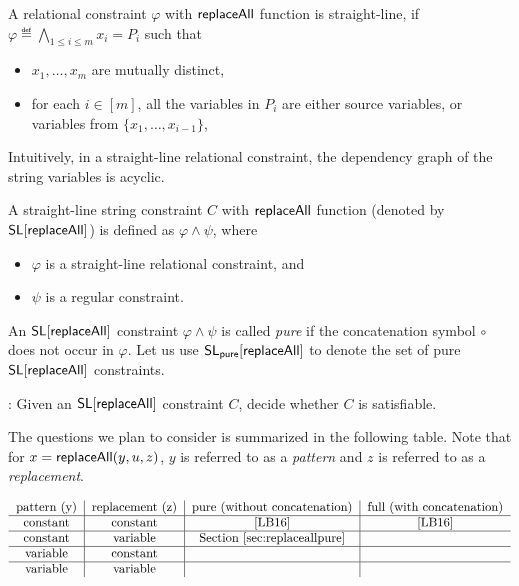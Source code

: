 \documentclass[sigplan,10pt,review,anonymous]{acmart}\settopmatter{printfolios=true}
\newcommand{\concat} {\circ}
\begin{document}
\begin{definition}
	A relational constraint $ \varphi$ with $\mathsf{replaceAll}$ function is straight-line, if $\varphi \eqdef \bigwedge \limits_{1 \le i \le m} x_i = P_i$ such that
	\begin{itemize}
		\item $x_1,\dots, x_m$ are mutually distinct,
		\item for each $i \in [m]$, all the variables in $P_i$ are either source variables, or variables from $\{x_1,\dots, x_{i-1}\}$,
	\end{itemize}
\end{definition}
Intuitively, in a straight-line relational constraint, the dependency graph of the string variables is acyclic.


\begin{definition}
	A straight-line string constraint $C$ with $\mathsf{replaceAll}$ function (denoted by $\mathsf{SL}[\mathsf{replaceAll}]$)  is defined as $ \varphi \wedge \psi$,  where 
	\begin{itemize}
		\item $\varphi$ is a straight-line relational constraint,  and
		\item $\psi$ is a regular constraint.
	\end{itemize}
	An $\mathsf{SL}[\mathsf{replaceAll}]$ constraint $\varphi \wedge \psi$ is called \emph{pure} if the concatenation symbol $\concat$ does not occur in $\varphi$. Let us use $\mathsf{SL_{pure}}[\mathsf{replaceAll}]$ to denote the set of pure $\mathsf{SL}[\mathsf{replaceAll}]$ constraints.
\end{definition}


: Given an $\mathsf{SL}[\mathsf{replaceAll}]$ constraint $C$, decide whether $C$ is satisfiable.

The questions we plan to consider is summarized in the following table. Note that for $x=\mathsf{replaceAll} (y,u,z)$, $y$ is referred to as a \emph{pattern} and $z$ is referred to as a \emph{replacement}.

\[
\begin{tabular}{c|c|c|c}
pattern (y)  &   replacement (z)        &   pure (without concatenation) &  full (with concatenation) \\
\hline
constant  &   constant                       & \cite{LB16}    &  \cite{LB16}   \\
\hline
constant  &   variable                       &  Section \ref{sec:replaceallpure}       &    \\
\hline
variable  &   constant                       &         &    \\
\hline
variable  &   variable                       &        &    \\
\end{tabular}
\]
\end{document}
